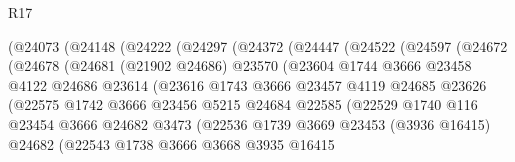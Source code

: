 \begin{lexlean}{R17}
\begin{coremodule}
                  (@24073
                    (@24148
                      (@24222
                        (@24297
                          (@24372
                            (@24447
                              (@24522
                                (@24597
                                  (@24672
                                    (@24678
                                      (@24681
                                        (@21902 @24686)
                                        @23570
                                        (@23604
                                          @1744
                                          @3666
                                          @23458
                                          @4122
                                          @24686
                                          @23614
                                          (@23616
                                            @1743
                                            @3666
                                            @23457
                                            @4119
                                            @24685
                                            @23626
                                            (@22575
                                              @1742
                                              @3666
                                              @23456
                                              @5215
                                              @24684
                                              @22585
                                              (@22529
                                                @1740
                                                @116
                                                @23454
                                                @3666
                                                @24682
                                                @3473
                                                (@22536
                                                  @1739
                                                  @3669
                                                  @23453
                                                  (@3936 @16415)
                                                  @24682
                                                  (@22543
                                                    @1738
                                                    @3666
                                                    @3668
                                                    @3935
                                                    @16415

\end{coremodule}
\end{lexlean}
